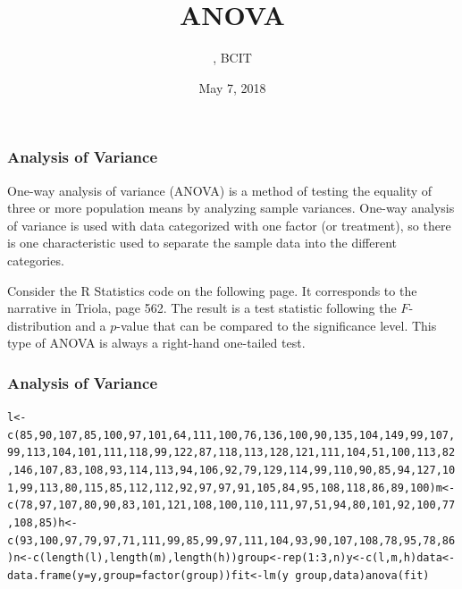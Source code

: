 \documentclass[xcolor=dvipsnames]{beamer} \usepackage{teachbeamer}
\title{ANOVA} \subtitle{{\CourseNumber}, BCIT}
\author{\CourseName}
\date{May 7, 2018}
\begin{document}
\begin{frame} \titlepage
\end{frame}

\begin{frame}
  \frametitle{Analysis of Variance} One-way analysis of variance (ANOVA) is a method of testing the equality of three or more population means by analyzing sample variances. One-way analysis of variance is used with data categorized with one factor (or treatment), so there is one characteristic used to separate the sample data into the different categories.

\bigskip

Consider the R Statistics code on the following page. It corresponds to the narrative in Triola, page 562. The result is a test statistic following the $F$-distribution and a $p$-value that can be compared to the significance level. This type of ANOVA is always a right-hand one-tailed test. %
\end{frame}

\begin{frame}[fragile]
  \frametitle{Analysis of Variance}
\begin{scriptsize}
\begin{alltt} l<-c(85,90,107,85,100,97,101,64,111,100,76,136,100,90,135,104,149,99,1 07,99,113,104,101,111,118,99,122,87,118,113,128,121,111,104,51,100,113, 82,146,107,83,108,93,114,113,94,106,92,79,129,114,99,110,90,85,94,127, 101,99,113,80,115,85,112,112,92,97,97,91,105,84,95,108,118,86,89,100) m<-c(78,97,107,80,90,83,101,121,108,100,110,111,97,51,94,80,101,92,100, 77,108,85) h<-c(93,100,97,79,97,71,111,99,85,99,97,111,104,93,90,107,108,78,95,78, 86) n<-c(length(l),length(m),length(h)) group<-rep(1:3,n) y<-c(l,m,h) data<-data.frame(y=y,group=factor(group)) fit<-lm(y~group,data) anova(fit)
\end{alltt}
\end{scriptsize}
\end{frame}
\end{document}
